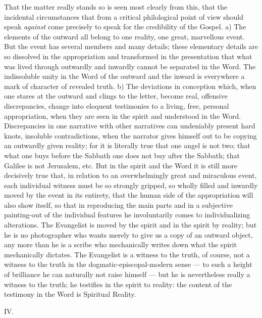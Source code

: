 \documentclass[12pt,a4paper,openany]{book}
\newcommand{\opage}[1]{\marginnote{\footnotesize\textit{[#1]}}}
\begin{document}
That the matter really stands so is seen most clearly
from this, that the incidental circumstances that from a critical
philological point of view should speak \emph{against} come
precisely to speak for the credibility of the Gospel. a) The elements of
the outward all belong to one reality, one great, marvellous
event. But the event has several members
and many details; these elementary details are
so dissolved in the appropriation and transformed in the presentation
that what was lived through outwardly and inwardly cannot
be separated in the Word. The indissoluble unity in the Word of the
outward and the inward is everywhere a mark of character
of revealed truth. b) The deviations in conception
which, when one stares at the outward and
clings to the letter, become real, offensive
discrepancies, change into eloquent testimonies
to a living, free, personal appropriation, when they are seen in the spirit
and understood in the Word. Discrepancies in one narrative
with other narratives can undeniably present
hard knots, insoluble contradictions, when the narrator
gives himself out to be copying an outwardly given
reality; for it is literally true that one angel
is not two; that what one buys before the Sabbath one does
not buy after the Sabbath; that Galilee is not Jerusalem, etc.
But in the spirit and the Word it is still more decisively
true that, in relation to an overwhelmingly great and miraculous
\setcounter{footnote}{0}%
\opage{17}event, each individual witness must be so strongly
gripped, so wholly filled and inwardly moved by the event
in its entirety, that the human side of the appropriation
will also show itself, so that in reproducing
the main parts and in a subjective painting-out of the
individual features he involuntarily comes to individualizing
alterations. The Evangelist is moved by the spirit
and in the spirit by reality; but he is no photographer
who wants merely to give us a copy of an outward object,
any more than he is a scribe who mechanically writes down
what the spirit mechanically dictates. The Evangelist is
a witness to the truth, of course, not a witness to the truth in the dogmatic-episcopal-modern
sense --- to such a height of
brilliance he can naturally not raise himself ---
but he is nevertheless really a witness to the truth; he testifies
in the spirit to reality: the content of the testimony in the Word
is Spiritual Reality.

\begin{center}IV.\end{center}
\end{document}
